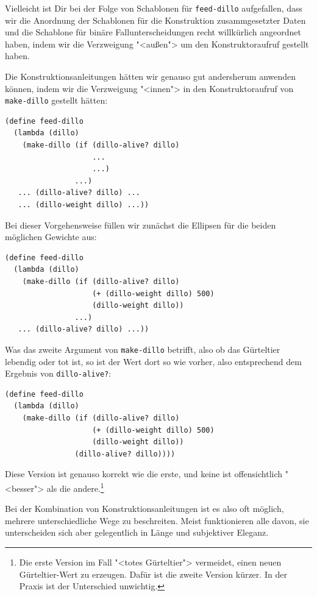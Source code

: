 Vielleicht ist Dir bei der Folge von Schablonen für
\lstinline{feed-dillo} aufgefallen, dass wir die Anordnung der Schablonen für
die Konstruktion zusammgesetzter Daten und die Schablone für binäre
Fallunterscheidungen recht willkürlich angeordnet haben, indem wir die
Verzweigung "<außen"> um den Konstruktoraufruf gestellt haben.

Die Konstruktionsanleitungen hätten wir genauso gut andersherum
anwenden können, indem wir die Verzweigung "<innen"> in den
Konstruktoraufruf von \lstinline{make-dillo} gestellt hätten:
%
\begin{lstlisting}
(define feed-dillo
  (lambda (dillo)
    (make-dillo (if (dillo-alive? dillo)
                    ...
                    ...)
                ...)
   ... (dillo-alive? dillo) ...
   ... (dillo-weight dillo) ...))
\end{lstlisting}
%
Bei dieser Vorgehensweise füllen wir zunächst die Ellipsen für die
beiden möglichen Gewichte aus:
%
\begin{lstlisting}
(define feed-dillo
  (lambda (dillo)
    (make-dillo (if (dillo-alive? dillo)
                    (+ (dillo-weight dillo) 500)
                    (dillo-weight dillo))
                ...)
   ... (dillo-alive? dillo) ...))
\end{lstlisting}
%
Was das zweite Argument von \lstinline{make-dillo} betrifft, also ob das
Gürteltier lebendig oder tot ist, so ist der Wert dort so wie
vorher, also entsprechend dem Ergebnis von \lstinline{dillo-alive?}:
%
\begin{lstlisting}
(define feed-dillo
  (lambda (dillo)
    (make-dillo (if (dillo-alive? dillo)
                    (+ (dillo-weight dillo) 500)
                    (dillo-weight dillo))
                (dillo-alive? dillo))))
\end{lstlisting}
%
Diese Version ist genauso korrekt wie die erste, und keine ist
offensichtlich "<besser"> als die andere.\footnote{Die erste Version im Fall
  "<totes Gürteltier"> vermeidet, einen neuen Gürteltier-Wert zu erzeugen.
  Dafür ist die zweite Version kürzer.  In der Praxis ist der
  Unterschied unwichtig.}

Bei der Kombination von Konstruktionsanleitungen ist es also oft
möglich, mehrere unterschiedliche Wege zu beschreiten.  Meist
funktionieren alle davon, sie unterscheiden sich aber gelegentlich in
Länge und subjektiver Eleganz.

